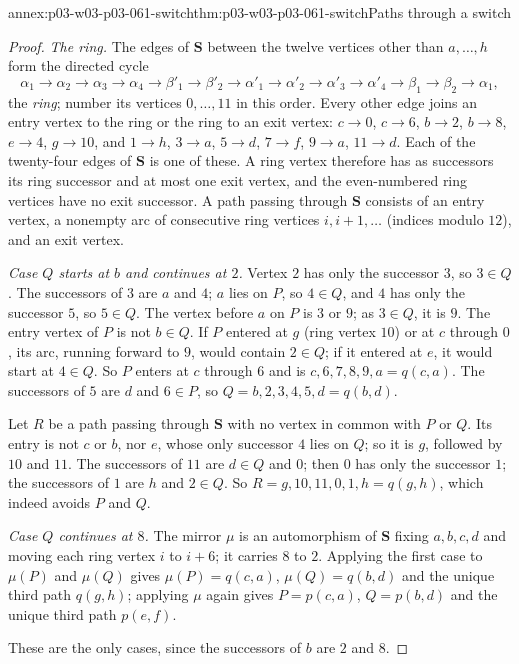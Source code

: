 \begin{annexitem}{annex:p03-w03-p03-061-switch}{thm:p03-w03-p03-061-switch}{Paths through a switch}
\begin{proof}
\emph{The ring.} The edges of \(\mathbf S\) between the twelve vertices other
than \(a,\ldots,h\) form the directed cycle
\[
 \alpha_1\to\alpha_2\to\alpha_3\to\alpha_4\to\beta'_1\to\beta'_2\to
 \alpha'_1\to\alpha'_2\to\alpha'_3\to\alpha'_4\to\beta_1\to\beta_2\to\alpha_1,
\]
the \emph{ring}; number its vertices \(0,\ldots,11\) in this order. Every
other edge joins an entry vertex to the ring or the ring to an exit vertex:
\(c\to0\), \(c\to6\), \(b\to2\), \(b\to8\), \(e\to4\), \(g\to10\), and
\(1\to h\), \(3\to a\), \(5\to d\), \(7\to f\), \(9\to a\), \(11\to d\). Each
of the twenty-four edges of \(\mathbf S\) is one of these. A ring vertex
therefore has as successors its ring successor and at most one exit vertex,
and the even-numbered ring vertices have no exit successor. A path passing
through \(\mathbf S\) consists of an entry vertex, a nonempty arc of
consecutive ring vertices \(i,i+1,\ldots\) (indices modulo \(12\)), and an
exit vertex.

\emph{Case \(Q\) starts at \(b\) and continues at \(2\).} Vertex \(2\) has
only the successor \(3\), so \(3\in Q\). The successors of \(3\) are \(a\)
and \(4\); \(a\) lies on \(P\), so \(4\in Q\), and \(4\) has only the successor
\(5\), so \(5\in Q\). The vertex before \(a\) on \(P\) is \(3\) or \(9\); as
\(3\in Q\), it is \(9\). The entry vertex of \(P\) is not \(b\in Q\). If \(P\)
entered at \(g\) (ring vertex \(10\)) or at \(c\) through \(0\), its arc,
running forward to \(9\), would contain \(2\in Q\); if it entered at \(e\), it
would start at \(4\in Q\). So \(P\) enters at \(c\) through \(6\) and is
\(c,6,7,8,9,a=q(c,a)\). The successors of \(5\) are \(d\) and \(6\in P\), so
\(Q=b,2,3,4,5,d=q(b,d)\).

Let \(R\) be a path passing through \(\mathbf S\) with no vertex in common with
\(P\) or \(Q\). Its entry is not \(c\) or \(b\), nor \(e\), whose only
successor \(4\) lies on \(Q\); so it is \(g\), followed by \(10\) and \(11\).
The successors of \(11\) are \(d\in Q\) and \(0\); then \(0\) has only the
successor \(1\); the successors of \(1\) are \(h\) and \(2\in Q\). So
\(R=g,10,11,0,1,h=q(g,h)\), which indeed avoids \(P\) and \(Q\).

\emph{Case \(Q\) continues at \(8\).} The mirror \(\mu\) is an automorphism of
\(\mathbf S\) fixing \(a,b,c,d\) and moving each ring vertex \(i\) to
\(i+6\); it carries \(8\) to \(2\). Applying the first case to \(\mu(P)\)
and \(\mu(Q)\) gives \(\mu(P)=q(c,a)\), \(\mu(Q)=q(b,d)\) and the unique third
path \(q(g,h)\); applying \(\mu\) again gives \(P=p(c,a)\), \(Q=p(b,d)\) and the
unique third path \(p(e,f)\).

These are the only cases, since the successors of \(b\) are \(2\) and \(8\).
\end{proof}
\end{annexitem}

